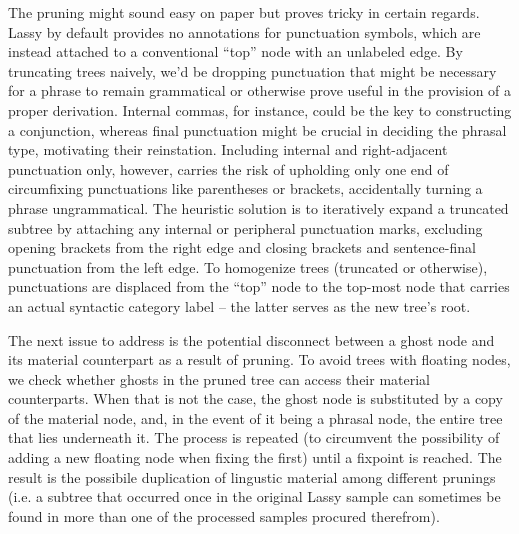The pruning might sound easy on paper but proves tricky in certain regards.
Lassy by default provides no annotations for punctuation symbols, which are instead attached to a conventional ``top'' node with an unlabeled edge.
By truncating trees naively, we'd be dropping punctuation that might be necessary for a phrase to remain grammatical or otherwise prove useful in the provision of a proper derivation.
Internal commas, for instance, could be the key to constructing a conjunction, whereas final punctuation might be crucial in deciding the phrasal type, motivating their reinstation.
Including internal and right-adjacent punctuation only, however, carries the risk of upholding only one end of circumfixing punctuations like parentheses or brackets, accidentally turning a phrase ungrammatical.
The heuristic solution is to iteratively expand a truncated subtree by attaching any internal or peripheral punctuation marks, excluding opening brackets from the right edge and closing brackets and sentence-final punctuation from the left edge.
To homogenize trees (truncated or otherwise), punctuations are displaced from the ``top'' node to the top-most node that carries an actual syntactic category label -- the latter serves as the new tree's root.

The next issue to address is the potential disconnect between a ghost node and its material counterpart as a result of pruning.
To avoid trees with floating nodes, we check whether ghosts in the pruned tree can access their material counterparts.
When that is not the case, the ghost node is substituted by a copy of the material node, and, in the event of it being a phrasal node, the entire tree that lies underneath it.
The process is repeated (to circumvent the possibility of adding a new floating node when fixing the first) until a fixpoint is reached.
The result is the possibile duplication of lingustic material among different prunings (i.e. a subtree that occurred once in the original Lassy sample can sometimes be found in more than one of the processed samples procured therefrom).

